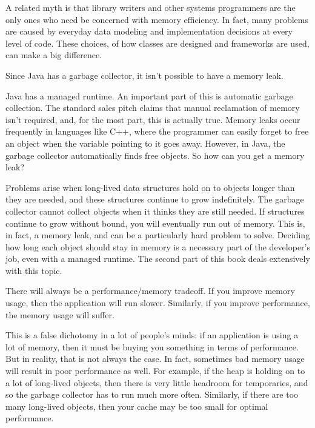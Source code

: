 A related myth is that library writers and other systems programmers are the only ones
who need be concerned with memory efficiency. In fact, many problems
are caused by everyday data modeling
and implementation decisions at every level of code. These choices, of how classes are designed and 
frameworks are used, can make a big difference.

{Since Java has a garbage collector, it isn't possible
to have a memory leak.
}

Java has a managed runtime. An important
part of this is automatic garbage collection. The standard sales pitch
claims that manual reclamation of memory isn't required, and, for
the most part, this is actually true. Memory leaks occur frequently in
languages like C++, where the programmer can easily forget to free an
object when the variable pointing to it goes away.  However, in Java, the
garbage collector automatically finds free objects. So how can you get a
memory leak?

Problems arise when long-lived data
structures hold on to objects longer than they are needed, and these structures
continue to grow indefinitely. The garbage collector cannot collect objects
when it thinks they are still needed. If structures continue to grow without
bound, you will eventually run out of memory. This is, in fact, a memory leak, 
and can be a particularly hard problem to solve. Deciding how long each object
should stay in memory is a necessary part of the developer's job, even with a
managed runtime. The second part of this book deals extensively with
this topic.

{There will always be a performance/memory tradeoff. If you improve memory
usage, then the application will run slower. 
Similarly, if you improve performance, the memory usage will suffer.
} 

This is a false dichotomy in a lot of people's minds: if an application is
using a lot of memory, then it must be buying you something in terms of performance. 
But in reality, that is not always the case. In fact, sometimes bad memory usage will
result in poor performance as well. For example, if 
the heap is holding on to a lot of long-lived objects, then there is very little
headroom for temporaries, and so the garbage collector has to run much more
often.  Similarly, if there are too many long-lived objects, then your cache may
be too small for optimal performance.

